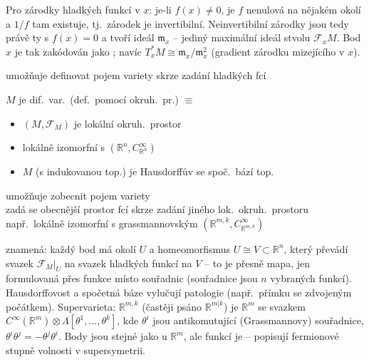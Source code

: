 \begin{vysvetleni}
Pro zárodky hladkých funkcí v $x$: je-li $f(x)\neq0$, je $f$ nenulová na nějakém okolí a $1/f$ tam existuje, tj.\ zárodek je invertibilní.
Neinvertibilní zárodky jsou tedy právě ty s $f(x)=0$ a tvoří ideál $\mathfrak{m}_x$ -- jediný maximální ideál stvolu $\mathcal{F}_xM$.
Bod $x$ je tak zakódován jako ; navíc $T^*_xM\cong\mathfrak{m}_x/\mathfrak{m}_x^2$ (gradient zárodku mizejícího v $x$).
\end{vysvetleni}

umožňuje definovat pojem variety skrze zadání hladkých fcí

\begin{veta}
$M$ je dif.\ var.\ (def.\ pomocí okruh.\ pr.) $\equiv$
\begin{itemize}[nosep]
  \item[] $(M,\mathcal{F}_M)$ je lokální okruh.\ prostor
  \item[] lokálně izomorfní s $(\mathbb{R}^n, C^\infty_{\mathbb{R}^n})$
  \item[] $M$ (s indukovanou top.) je Hausdorffův se spoč.\ bází top.
\end{itemize}
\end{veta}

umožňuje zobecnit pojem variety \\
\quad zadá se obecnější prostor fcí skrze zadání jiného lok.\ okruh.\ prostoru \\
\quad např.\ lokálně izomorfní s grassmannovským $(\mathbb{R}^{m,k}, C^\infty_{\mathbb{R}^{m,k}})$

\begin{vysvetleni}
 znamená: každý bod má okolí $U$ a homeomorfismus $U\cong V\subset\mathbb{R}^n$, který převádí svazek $\mathcal{F}_M|_U$ na svazek hladkých funkcí
na $V$ -- to je přesně mapa, jen formulovaná přes funkce místo souřadnic (souřadnice jsou $n$ vybraných funkcí). Hausdorffovost a spočetná báze vylučují
patologie (např.\ přímku se zdvojeným počátkem). Supervarieta: $\mathbb{R}^{m,k}$ (častěji psáno $\mathbb{R}^{m|k}$) je $\mathbb{R}^m$ se svazkem
$C^\infty(\mathbb{R}^m)\otimes\Lambda[\theta^1,\dots,\theta^k]$, kde $\theta^i$ jsou antikomutující (Grassmannovy) souřadnice, $\theta^i\theta^j=-\theta^j\theta^i$.
Body jsou stejné jako u $\mathbb{R}^m$, ale funkcí je  -- popisují fermionové stupně volnosti v supersymetrii.
\end{vysvetleni}

